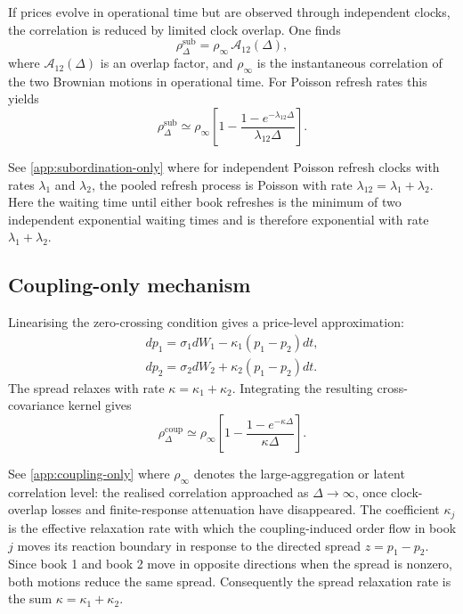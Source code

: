 \documentclass[5p,final]{elsarticle}
\begin{document}
If prices evolve in operational time but are observed through independent clocks, the correlation is reduced
by limited clock overlap.
One finds
\begin{equation}
 \rho_\Delta^{\mathrm{sub}}=\rho_\infty \, \mathcal{A}_{12}(\Delta),
\end{equation}
where $\mathcal{A}_{12}(\Delta)$ is an overlap factor, and $\rho_{\infty}$ is the instantaneous correlation of the two Brownian motions in operational time. For Poisson refresh rates this yields
\begin{equation}
 \rho_\Delta^{\mathrm{sub}}
 \simeq
 \rho_\infty \left[1-\frac{1-e^{-\lambda_{12}\Delta}}{\lambda_{12}\Delta}\right].
\end{equation}

See \ref{app:subordination-only} where for independent Poisson refresh clocks with rates \(\lambda_1\) and \(\lambda_2\), the pooled refresh process is Poisson with rate $\lambda_{12}=\lambda_1+\lambda_2$.
Here the waiting time until either book refreshes is the minimum of two independent exponential waiting times and is therefore exponential with rate \(\lambda_1+\lambda_2\).

\subsection{Coupling-only mechanism}

Linearising the zero-crossing condition gives a price-level approximation:
\begin{align}
 dp_1=\sigma_1 dW_1-\kappa_1(p_1-p_2)dt, \\
 dp_2=\sigma_2 dW_2+\kappa_2(p_1-p_2)dt.
 \label{eq:coupling-only}
\end{align}
The spread relaxes with rate $\kappa=\kappa_1+\kappa_2$.
Integrating the resulting cross-covariance kernel gives
\begin{equation}
 \rho_\Delta^{\mathrm{coup}}
 \simeq
 \rho_\infty \left[1-\frac{1-e^{-\kappa\Delta}}{\kappa\Delta}\right].
\end{equation}

See \ref{app:coupling-only} where \(\rho_\infty\) denotes the large-aggregation or latent correlation level: the realised correlation approached as \(\Delta\to\infty\), once clock-overlap losses and finite-response attenuation have disappeared. The coefficient \(\kappa_j\) is the effective relaxation rate with which the coupling-induced order flow in book \(j\) moves its reaction boundary in response to the directed spread \(z=p_1-p_2\). Since book 1 and book 2 move in opposite directions when the spread is nonzero, both motions reduce the same spread. Consequently the spread relaxation rate is the sum \(\kappa=\kappa_1+\kappa_2\).
\end{document}
